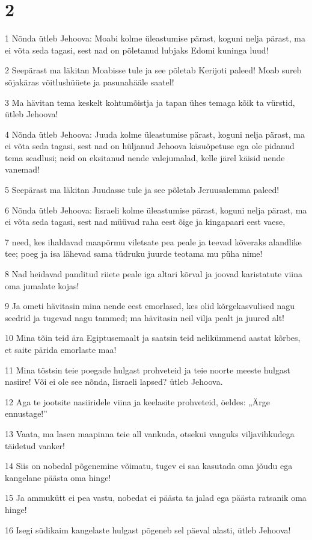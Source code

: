 \chapter{2}

\par 1 Nõnda ütleb Jehoova: Moabi kolme üleastumise pärast, koguni nelja pärast, ma ei võta seda tagasi, sest nad on põletanud lubjaks Edomi kuninga luud!
\par 2 Seepärast ma läkitan Moabisse tule ja see põletab Kerijoti paleed! Moab sureb sõjakäras võitlushüüete ja pasunahääle saatel!
\par 3 Ma hävitan tema keskelt kohtumõistja ja tapan ühes temaga kõik ta vürstid, ütleb Jehoova!
\par 4 Nõnda ütleb Jehoova: Juuda kolme üleastumise pärast, koguni nelja pärast, ma ei võta seda tagasi, sest nad on hüljanud Jehoova käsuõpetuse ega ole pidanud tema seadlusi; neid on eksitanud nende valejumalad, kelle järel käisid nende vanemad!
\par 5 Seepärast ma läkitan Juudasse tule ja see põletab Jeruusalemma paleed!
\par 6 Nõnda ütleb Jehoova: Iisraeli kolme üleastumise pärast, koguni nelja pärast, ma ei võta seda tagasi, sest nad müüvad raha eest õige ja kingapaari eest vaese,
\par 7 need, kes ihaldavad maapõrmu viletsate pea peale ja teevad kõveraks alandlike tee; poeg ja isa lähevad sama tüdruku juurde teotama mu püha nime!
\par 8 Nad heidavad panditud riiete peale iga altari kõrval ja joovad karistatute viina oma jumalate kojas!
\par 9 Ja ometi hävitasin mina nende eest emorlased, kes olid kõrgekasvulised nagu seedrid ja tugevad nagu tammed; ma hävitasin neil vilja pealt ja juured alt!
\par 10 Mina tõin teid ära Egiptusemaalt ja saatsin teid nelikümmend aastat kõrbes, et saite pärida emorlaste maa!
\par 11 Mina tõstsin teie poegade hulgast prohveteid ja teie noorte meeste hulgast nasiire! Või ei ole see nõnda, Iisraeli lapsed? ütleb Jehoova.
\par 12 Aga te jootsite nasiiridele viina ja keelasite prohveteid, öeldes: „Ärge ennustage!”
\par 13 Vaata, ma lasen maapinna teie all vankuda, otsekui vanguks viljavihkudega täidetud vanker!
\par 14 Siis on nobedal põgenemine võimatu, tugev ei saa kasutada oma jõudu ega kangelane päästa oma hinge!
\par 15 Ja ammukütt ei pea vastu, nobedat ei päästa ta jalad ega päästa ratsanik oma hinge!
\par 16 Isegi südikaim kangelaste hulgast põgeneb sel päeval alasti, ütleb Jehoova!

